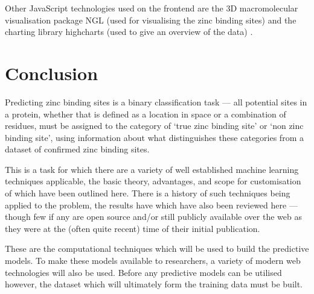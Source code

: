 Other JavaScript technologies used on the frontend are the 3D macromolecular visualisation package NGL (used for visualising the zinc binding sites) \cite{rose2015ngl} and the charting library highcharts (used to give an overview of the data) \cite{highcharts}.

\section{Conclusion}

Predicting zinc binding sites is a binary classification task --- all potential sites in a protein, whether that is defined as a location in space or a combination of residues, must be assigned to the category of `true zinc binding site' or `non zinc binding site', using information about what distinguishes these categories from a dataset of confirmed zinc binding sites.

This is a task for which there are a variety of well established machine learning techniques applicable, the basic theory, advantages, and scope for customisation of which have been outlined here. There is a history of such techniques being applied to the problem, the results have which have also been reviewed here --- though few if any are open source and/or still publicly available over the web as they were at the (often quite recent) time of their initial publication.

These are the computational techniques which will be used to build the predictive models. To make these models available to researchers, a variety of modern web technologies will also be used. Before any predictive models can be utilised however, the dataset which will ultimately form the training data must be built.